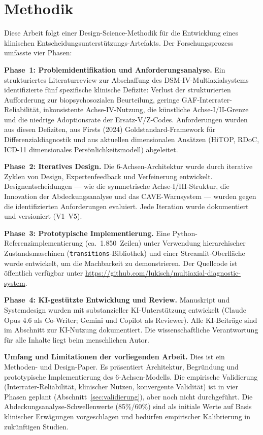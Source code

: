 \documentclass[11pt,a4paper]{article}
\begin{document}
\section*{Methodik}

Diese Arbeit folgt einer Design-Science-Methodik f\"ur die Entwicklung eines klinischen Entscheidungsunterst\"utzungs-Artefakts. Der Forschungsprozess umfasste vier Phasen:

\textbf{Phase~1: Problemidentifikation und Anforderungsanalyse.} Ein strukturiertes Literaturreview zur Abschaffung des DSM-IV-Multiaxialsystems identifizierte f\"unf spezifische klinische Defizite: Verlust der strukturierten Aufforderung zur biopsychosozialen Beurteilung, geringe GAF-Interrater-Reliabilit\"at, inkonsistente Achse-IV-Nutzung, die k\"unstliche Achse-I/II-Grenze und die niedrige Adoptionsrate der Ersatz-V/Z-Codes. Anforderungen wurden aus diesen Defiziten, aus Firsts (2024) Goldstandard-Framework f\"ur Differenzialdiagnostik und aus aktuellen dimensionalen Ans\"atzen (HiTOP, RDoC, ICD-11 dimensionales Pers\"onlichkeitsmodell) abgeleitet.

\textbf{Phase~2: Iteratives Design.} Die 6-Achsen-Architektur wurde durch iterative Zyklen von Design, Expertenfeedback und Verfeinerung entwickelt. Designentscheidungen --- wie die symmetrische Achse-I/III-Struktur, die Innovation der Abdeckungsanalyse und das CAVE-Warnsystem --- wurden gegen die identifizierten Anforderungen evaluiert. Jede Iteration wurde dokumentiert und versioniert (V1--V5).

\textbf{Phase~3: Prototypische Implementierung.} Eine Python-Referenzimplementierung (ca.\ 1.850~Zeilen) unter Verwendung hierarchischer Zustandsmaschinen (\texttt{transitions}-Bibliothek) und einer Streamlit-Oberfl\"ache wurde entwickelt, um die Machbarkeit zu demonstrieren. Der Quellcode ist \"offentlich verf\"ugbar unter \url{https://github.com/lukisch/multiaxial-diagnostic-system}.

\textbf{Phase~4: KI-gest\"utzte Entwicklung und Review.} Manuskript und Systemdesign wurden mit substanzieller KI-Unterst\"utzung entwickelt (Claude Opus 4.6 als Co-Writer; Gemini und Copilot als Reviewer). Alle KI-Beitr\"age sind im Abschnitt zur KI-Nutzung dokumentiert. Die wissenschaftliche Verantwortung f\"ur alle Inhalte liegt beim menschlichen Autor.

\textbf{Umfang und Limitationen der vorliegenden Arbeit.} Dies ist ein Methoden- und Design-Paper. Es pr\"asentiert Architektur, Begr\"undung und prototypische Implementierung des 6-Achsen-Modells. Die empirische Validierung (Interrater-Reliabilit\"at, klinischer Nutzen, konvergente Validit\"at) ist in vier Phasen geplant (Abschnitt~\ref{sec:validierung}), aber noch nicht durchgef\"uhrt. Die Abdeckungsanalyse-Schwellenwerte (85\%/60\%) sind als initiale Werte auf Basis klinischer Erw\"agungen vorgeschlagen und bed\"urfen empirischer Kalibrierung in zuk\"unftigen Studien.
\end{document}
